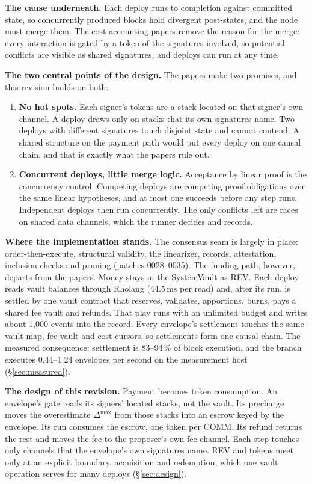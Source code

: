 \documentclass[11pt]{article}
\begin{document}
\textbf{The cause underneath.} Each deploy runs to completion against committed state, so concurrently produced blocks hold divergent post-states, and the node must merge them. The cost-accounting papers remove the reason for the merge: every interaction is gated by a token of the signatures involved, so potential conflicts are visible as shared signatures, and deploys can run at any time.

\textbf{The two central points of the design.} The papers make two promises, and this revision builds on both:
\begin{enumerate}
\item \textbf{No hot spots.} Each signer's tokens are a stack located on that signer's own channel. A deploy draws only on stacks that its own signatures name. Two deploys with different signatures touch disjoint state and cannot contend. A shared structure on the payment path would put every deploy on one causal chain, and that is exactly what the papers rule out.
\item \textbf{Concurrent deploys, little merge logic.} Acceptance by linear proof is the concurrency control. Competing deploys are competing proof obligations over the same linear hypotheses, and at most one succeeds before any step runs. Independent deploys then run concurrently. The only conflicts left are races on shared data channels, which the runner decides and records.
\end{enumerate}

\textbf{Where the implementation stands.} The consensus seam is largely in place: order-then-execute, structural validity, the linearizer, records, attestation, inclusion checks and pruning (patches 0028--0035). The funding path, however, departs from the papers. Money stays in the SystemVault as REV. Each deploy reads vault balances through Rholang (44.5\,ms per read) and, after its run, is settled by one vault contract that reserves, validates, apportions, burns, pays a shared fee vault and refunds. That play runs with an unlimited budget and writes about 1{,}000 events into the record. Every envelope's settlement touches the same vault map, fee vault and cost cursors, so settlements form one causal chain. The measured consequence: settlement is 83--94\,\% of block execution, and the branch executes 0.44--1.24 envelopes per second on the measurement host (\S\ref{sec:measured}).

\textbf{The design of this revision.} Payment becomes token consumption. An envelope's gate reads its signers' located stacks, not the vault. Its precharge moves the overestimate $\Delta^{\max}$ from those stacks into an escrow keyed by the envelope. Its run consumes the escrow, one token per COMM. Its refund returns the rest and moves the fee to the proposer's own fee channel. Each step touches only channels that the envelope's own signatures name. REV and tokens meet only at an explicit boundary, acquisition and redemption, which one vault operation serves for many deploys (\S\ref{sec:design}).
\end{document}

